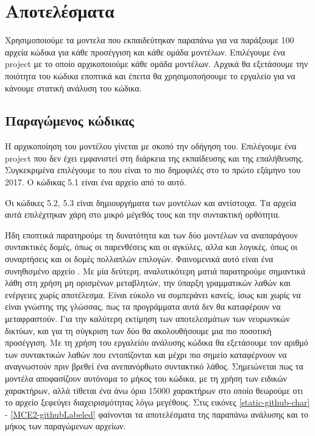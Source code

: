 \section{Αποτελέσματα}

Χρησιμοποιούμε τα μοντελα που εκπαιδεύτηκαν παραπάνω για να παράξουμε 100 αρχεία κώδικα για κάθε προσέγγιση και κάθε ομάδα μοντέλων.
Επιλέγουμε ένα  project με το οποίο αρχικοποιούμε κάθε ομάδα μοντέλων. 
Αρχικά θα εξετάσουμε την ποιότητα του κώδικα εποπτικά και έπειτα θα χρησιμοποήσουμε το εργαλείο  για να κάνουμε στατική ανάλυση του κώδικα.

\subsection{ Παραγώμενος κώδικας}

Η αρχικοποίηση του μοντέλου γίνεται με σκοπό την οδήγηση του.
Επιλέγουμε ένα project που δεν έχει εμφανιστεί στη διάρκεια της εκπαίδευσης και της επαλήθευσης.
Συγκεκριμένα επιλέγουμε το  που είναι το πιο δημοφιλές  στο  το πρώτο εξάμηνο του 2017.
Ο κώδικας 5.1 είναι ένα αρχείο από το  αυτό.



Όι κώδικες 5.2, 5.3 είναι δημιουργήματα των μοντέλων  και  αντίστοιχα. Τα αρχεία αυτά επιλέχτηκαν χάρη στο μικρό μέγεθός τους και την συντακτική ορθότητα.



Ήδη εποπτικά παρατηρούμε τη δυνατότητα και των δύο μοντέλων να αναπαράγουν συντακτικές δομές, όπως οι παρενθέσεις και οι αγκύλες, αλλα και λογικές, όπως οι συναρτήσεις και οι δομές πολλαπλών επιλογών.
Φαινομενικά αυτό είναι ένα συνηθισμένο αρχείο .
Με μία δεύτερη, αναλυτικότερη ματιά παρατηρούμε σημαντικά λάθη στη χρήση μη ορισμένων μεταβλητών, την ύπαρξη γραμματικών λαθών και ενέργειες χωρίς αποτέλεσμα. 
Είναι εύκολο να συμπεράνει κανείς, ίσως και χωρίς να είναι γνώστης της γλώσσας, πως τα προγράμματα αυτά δεν θα καταφέρουν να μεταφραστούν. 
Για την καλύτερη εκτίμηση των αποτελεσμάτων των νευρωνικών δικτύων, και για τη σύγκριση των δύο  θα ακολουθήσουμε μια πιο ποσοτική προσέγγιση. 
Με τη χρήση του εργαλείόυ ανάλυσης κώδικα  θα εξετάσουμε τον αριθμό των συντακτικών λαθών που εντοπίζονται και μέχρι πιο σημείο καταφέρνουν να αναγνωστούν πριν βρεθεί ένα ανεπανόρθωτο συντακτικό λάθος.
Σημειώνεται πως τα μοντέλα αποφασίζουν αυτόνομα το μήκος του κώδικα, με τη χρήση των ειδικών χαρακτήρων, αλλά τίθεται ένα άνω όριο 15000 χαρακτήρων στο οποίο θεωρούμε οτι το αρχείο ξεφεύγει διαχειρισμότητας λόγω μεγέθους.
Στις εικόνες \ref{static-github-char} - \ref{MCE2-githubLabeled} φαίνονται τα αποτελέσματα της παραπάνω ανάλυσης και το μήκος των παραγώμενων αρχείων.

